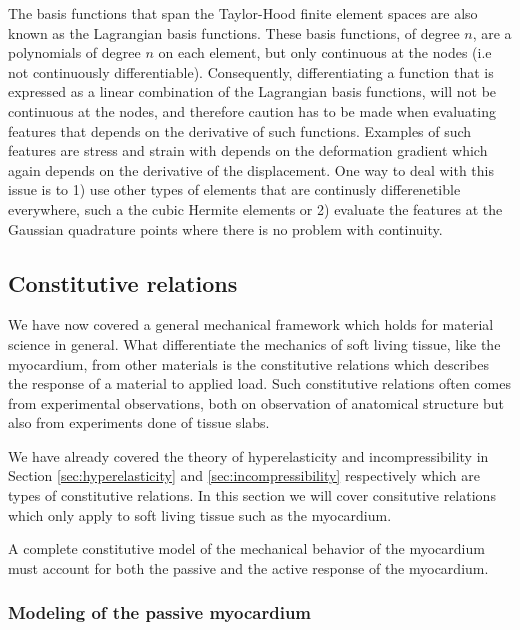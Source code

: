 \begin{remark}
  The basis functions that span the Taylor-Hood
  finite element spaces are also known as the
  Lagrangian basis functions. These basis functions, of
  degree $n$, are a polynomials of degree $n$ on each element, but only
  continuous at the nodes (i.e not continuously
  differentiable). Consequently, differentiating a function that is
  expressed as a linear combination of the Lagrangian basis functions,
  will not be continuous at the nodes, and therefore caution has to
  be made when evaluating features that depends on the derivative of
  such functions. Examples of such features are stress and
  strain with depends on the deformation gradient which again depends
  on the derivative of the displacement. One way to deal with this
  issue is to 1) use other types of elements that are continusly differenetible
  everywhere,  such a the cubic Hermite elements or 2) evaluate the features at the
  Gaussian quadrature points where there is no problem with continuity.
\end{remark}


\subsection{Constitutive relations}
\label{sec:constitutive_relations}
We have now covered a general mechanical framework which holds for
material science in general. What differentiate the mechanics of soft
living tissue, like the myocardium, from other materials is the
constitutive relations which describes the response of a material to
applied load. Such constitutive relations often comes from
experimental observations, both on observation of anatomical structure
but also from experiments done of tissue slabs.

We have already covered the theory of hyperelasticity and incompressibility in Section
\ref{sec:hyperelasticity} and \ref{sec:incompressibility} respectively
which are types of constitutive relations. In this section we will
cover consitutive relations which only apply to soft living tissue
such as the myocardium. 

A complete constitutive model of the mechanical behavior of the
myocardium must account for both the passive and the active response
of the myocardium.


\subsubsection{Modeling of the passive myocardium}

